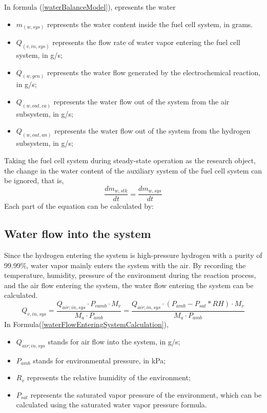 In formula (\ref{waterBalanceModel}), epresents the water
\begin{itemize}
	\item $m_(w,sys)$ represents the water content inside the fuel cell system, in grams.
	\item $Q_(v,in,sys)$ represents the flow rate of water vapor entering the fuel cell system, in g/s;
	\item $Q_(w,gen)$ represents the water flow generated by the electrochemical reaction, in g/s;
	\item $Q_(w,out,ca)$ represents the water flow out of the system from the air subsystem, in g/s;
	\item $Q_(w,out,an)$ represents the water flow out of the system from the hydrogen subsystem, in g/s;
\end{itemize}
Taking the fuel cell system during steady-state operation as the research object,
the change in the water content of the auxiliary system of the fuel cell system can be ignored, that is,
\begin{equation}\label{changeInWaterContent}
	\frac{d m_{w,s t k}}{d t}=\frac{d m_{w,s y s}}{d t}
\end{equation}
Each part of the equation can be calculated by:
\subsection*{Water flow into the system}
Since the hydrogen entering the system is high-pressure hydrogen with a purity of 99.99\%, water vapor mainly enters the system with the air. By recording the temperature, humidity, pressure of the environment during the reaction process, and the air flow entering the system, the water flow entering the system can be calculated.
\begin{equation}\label{waterFlowEnteringSystemCalculation}
	Q_{v,i n,s y s}={\frac{Q_{a i r;i n,s y s}\cdot P_{v a m b} \cdot M_{v}}{M_{a} \cdot P_{a m b}}}={\frac{Q_{a i r;i n,s y s}\cdot (P_{a m b} - P_{s a t} \ast RH)\cdot M_{v}}{M_{a} \cdot P_{a m b}}}
\end{equation}
In Formula(\ref{waterFlowEnteringSystemCalculation}),
\begin{itemize}
	\item $Q_{a i r;i n,s y s}$ stands for air flow into the system, in g/s;
	\item $P_{a m b}$ stands for environmental pressure, in kPa;
	\item $R_{v}$ represents the relative humidity of the environment;
	\item $P_{sat}$ represents the saturated vapor pressure of the environment, which can be calculated using the saturated water vapor pressure formula.
\end{itemize}

